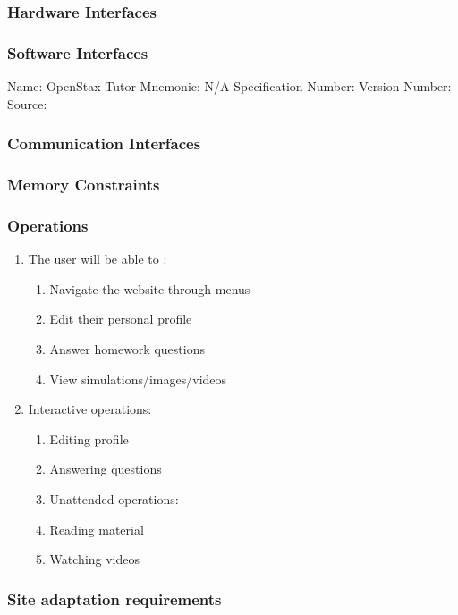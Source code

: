 \documentclass[onecolumn, draftclsnofoot,10pt, compsoc]{IEEEtran}
\begin{document}
\subsubsection{Hardware Interfaces}

\subsubsection{Software Interfaces}
Name: OpenStax Tutor 
Mnemonic: N/A
Specification Number:
Version Number:
Source: 

\subsubsection{Communication Interfaces}

\subsubsection{Memory Constraints}

\subsubsection{Operations}

\begin{enumerate}
\item The user will be able to :
\begin{enumerate}
\item Navigate the website through menus
\item Edit their personal profile
\item Answer homework questions
\item View simulations/images/videos
\end{enumerate}
\item Interactive operations:
\begin{enumerate}
\item Editing profile
\item Answering questions
\item Unattended operations:
\item Reading material
\item Watching videos
\end{enumerate}
\end{enumerate}

\subsubsection{Site adaptation requirements}
\end{document}
